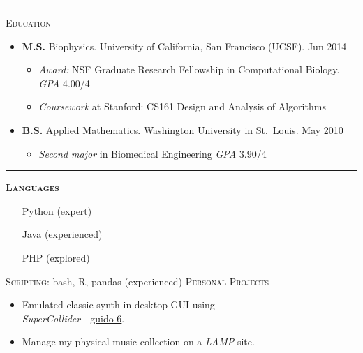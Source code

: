 \documentclass[10pt,letterpaper]{article}
\begin{document}
\par\nopagebreak\smallskip\hrule\medskip
{\Large\textsc{Education}}
\begin{itemize}
  \item {\bf M.S.} Biophysics. University of California, San Francisco (UCSF). \hfill{Jun 2014}
    \begin{itemize}[leftmargin=1.5em]
    \item \emph{Award:} NSF Graduate Research Fellowship in Computational Biology. \hfill{\emph{GPA }4.00/4} 
    \item \emph{Coursework} at Stanford: CS161 Design and Analysis of Algorithms
    \end{itemize}
  \item {\bf B.S.} Applied Mathematics. Washington University in St.~Louis. \hfill{May 2010}
    \begin{itemize}[leftmargin=1.5em]
    \item \emph{Second major} in Biomedical Engineering \hfill{\emph{GPA }3.90/4}
    \end{itemize}
\end{itemize}

\par\nopagebreak\medskip\hrule
\setlength{\multicolsep}{4.0pt plus 1.333pt minus 1.0pt}
\setlength{\columnsep}{0pt}
\begin{multicols}{2}
    {\bf\textsc{Languages}}
    \begin{itemize}[leftmargin=5em,itemsep=0em,parsep=0.15em,label={}]
        \item[Python] (expert)
        \item[Java] (experienced)
        \item[PHP] (explored)
    \end{itemize}
    \textsc{Scripting:} bash, R, pandas (experienced)
    \vfill\columnbreak
    \textsc{Personal Projects}
    \begin{itemize}[label={$\cdot$}]
        \item Emulated classic synth in desktop GUI using \\ \emph{SuperCollider} - \href{http://www.github.com/thomasvstevens/guido-6}{guido-6}.
        \item Manage my physical music collection on a \emph{LAMP} site.
    \end{itemize}
\end{multicols}
\end{document}

